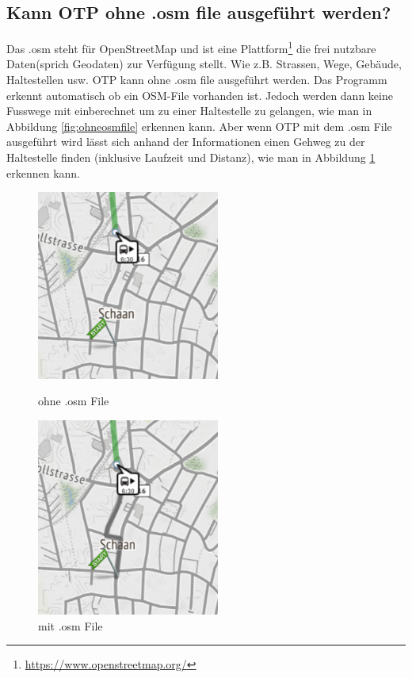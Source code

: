 \subsection{Kann OTP ohne .osm file ausgeführt werden?}
Das .osm steht für OpenStreetMap und ist eine Plattform\footnote{\url{https://www.openstreetmap.org/}} die frei nutzbare Daten(sprich Geodaten) zur Verfügung stellt. Wie z.B. Strassen, Wege, Gebäude, Haltestellen usw. OTP kann ohne .osm file ausgeführt werden. Das Programm erkennt automatisch ob ein OSM-File vorhanden ist. Jedoch werden dann keine Fusswege mit einberechnet um zu einer Haltestelle zu gelangen, wie man in Abbildung \ref{fig:ohneosmfile} erkennen kann.
Aber wenn OTP mit dem .osm File ausgeführt wird lässt sich anhand der Informationen einen Gehweg zu der Haltestelle finden (inklusive Laufzeit und Distanz), wie man in Abbildung \ref{fig:mitosmfile} erkennen kann. 

\begin{figure}[htb]
	\centering
	\begin{minipage}{0.45\linewidth}
		\centering
		\includegraphics[width=6cm]{img/ohneosmfile.png}
		\caption{ohne .osm File}
		\label{fig:ohneosmfile}
	\end{minipage}
	\begin{minipage}{0.45\linewidth}
		\centering
		\includegraphics[width=6cm]{img/mitosmfile.png}
		\caption{mit .osm File}
		\label{fig:mitosmfile}
	\end{minipage}
\end{figure}





